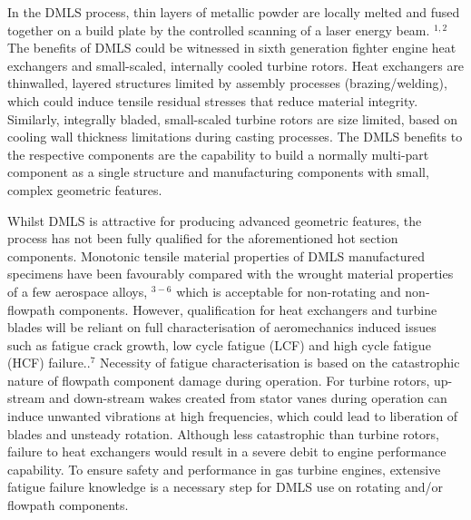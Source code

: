 \documentclass[10pt]{article}
\begin{document}
In the DMLS process, thin layers of metallic powder are locally melted and fused together on a build plate by the controlled scanning of a laser energy beam. ${ }^{1,2}$ The benefits of DMLS could be witnessed in sixth generation fighter engine heat exchangers and small-scaled, internally cooled turbine rotors. Heat exchangers are thinwalled, layered structures limited by assembly processes (brazing/welding), which could induce tensile residual stresses that reduce material integrity. Similarly, integrally bladed, small-scaled turbine rotors are size limited, based on cooling wall thickness limitations during casting processes. The DMLS benefits to the respective components are the capability to build a normally multi-part component as a single structure and manufacturing components with small, complex geometric features.

Whilst DMLS is attractive for producing advanced geometric features, the process has not been fully qualified for the aforementioned hot section components. Monotonic tensile material properties of DMLS manufactured specimens have been favourably compared with the wrought material properties of a few aerospace alloys, ${ }^{3-6}$ which is acceptable for non-rotating and non-flowpath components. However, qualification for heat exchangers and turbine blades will be reliant on full characterisation of aeromechanics induced issues such as fatigue crack growth, low cycle fatigue (LCF) and high cycle fatigue (HCF) failure..$^{7}$ Necessity of fatigue characterisation is based on the catastrophic nature of flowpath component damage during operation. For turbine rotors, up-stream and down-stream wakes created from stator vanes during operation can induce unwanted vibrations at high frequencies, which could lead to liberation of blades and unsteady rotation. Although less catastrophic than turbine rotors, failure to heat exchangers would result in a severe debit to engine performance capability. To ensure safety and performance in gas turbine engines, extensive fatigue failure knowledge is a necessary step for DMLS use on rotating and/or flowpath components.
\end{document}
